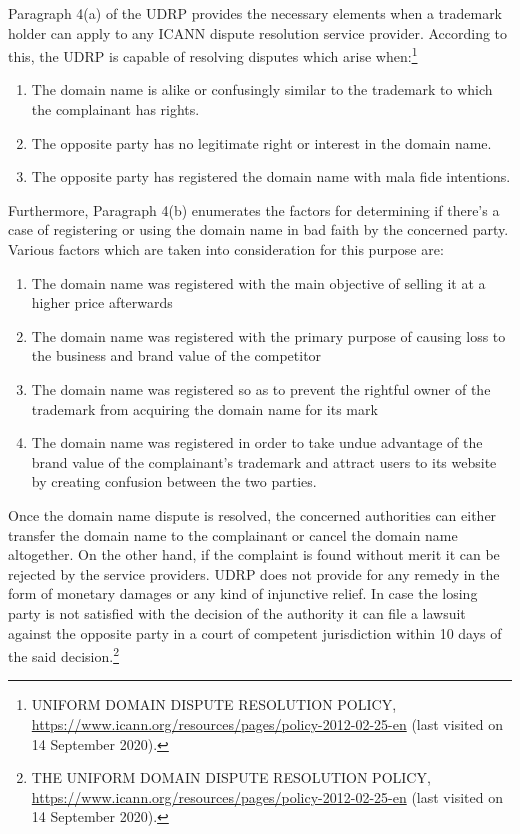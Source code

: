 \begin{multicols}{2}
\noi
Paragraph 4(a) of the UDRP provides the necessary elements when a trademark holder can
apply to any ICANN dispute resolution service provider. According to this, the UDRP is
capable of resolving disputes which arise when:\footnote{UNIFORM DOMAIN DISPUTE RESOLUTION POLICY,
\url{https://www.icann.org/resources/pages/policy-2012-02-25-en} (last visited on 14 September 2020).}

\begin{enumerate}[label=$\bullet$]
\itemsep=0pt
\item The domain name is alike or confusingly similar to the trademark to which the
complainant has rights.

\item The opposite party has no legitimate right or interest in the domain name.

\item The opposite party has registered the domain name with mala fide intentions.
\end{enumerate}

\noi
Furthermore, Paragraph 4(b) enumerates the factors for determining if there’s a case of
registering or using the domain name in bad faith by the concerned party. Various factors
which are taken into consideration for this purpose are:

\begin{enumerate}[label=$\bullet$]
\itemsep=0pt
\item The domain name was registered with the main objective of selling it at a higher price
afterwards

\item The domain name was registered with the primary purpose of causing loss to the
business and brand value of the competitor

\item The domain name was registered so as to prevent the rightful owner of the trademark
from acquiring the domain name for its mark

\item The domain name was registered in order to take undue advantage of the brand value
of the complainant’s trademark and attract users to its website by creating confusion
between the two parties. 
\end{enumerate}

\noi
Once the domain name dispute is resolved, the concerned authorities can either transfer the
domain name to the complainant or cancel the domain name altogether. On the other hand, if
the complaint is found without merit it can be rejected by the service providers. UDRP does
not provide for any remedy in the form of monetary damages or any kind of injunctive relief.
In case the losing party is not satisfied with the decision of the authority it can file a lawsuit
against the opposite party in a court of competent jurisdiction within 10 days of the said
decision.\footnote{THE UNIFORM DOMAIN DISPUTE RESOLUTION POLICY, \url{https://www.icann.org/resources/pages/policy-2012-02-25-en} (last visited on 14 September 2020).}


\end{multicols}
